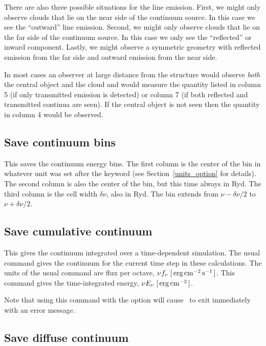 There are also three possible situations for the line emission.
First,
we might only observe clouds that lie on the near side of the continuum
source.
In this case we see the ``outward'' line emission.
Second, we
might only observe clouds that lie on the far side of the continuum source.
In this case we only see the ``reflected'' or inward component.
Lastly,
we might observe a symmetric geometry with reflected emission from the far
side and outward emission from the near side.

In most cases an observer at large distance from the structure would
observe \emph{both} the central object and the cloud and would measure the quantity
listed in column 5 (if only transmitted emission is detected) or column
7 (if both reflected and transmitted continua are seen).  If the central
object is not seen then the quantity in column 4 would be observed.

\subsection{Save continuum bins}

This saves the continuum energy bins.
The first column is the center
of the bin in whatever unit was set after the  keyword
(see Section~\ref{units_option} for details).
The second column is also the center of the bin, but this time always in Ryd.
The third column is the cell width $\delta\nu$, also in Ryd.
The bin extends from $\nu-\delta\nu/2$ to $\nu+\delta\nu/2$.

\subsection{Save cumulative continuum}
\label{sec:CommandSaveCumulativeContinuum}

This gives the continuum integrated over a time-dependent simulation.
The usual  command gives the
continuum for the current time step in these calculations.
The units of the usual  command
are flux per octave, $\nu f_{\nu}\; [\mbox{${\rm\thinspace erg}{\rm\thinspace cm}^{-2}{\rm\thinspace s}^{-1}\,$} ]$.
This command gives the time-integrated energy,
$\nu E_{\nu}\; [\mbox{${\rm\thinspace erg}{\rm\thinspace cm}^{-2}\,$} ]$.

\par
Note that using this command with the option 
will cause \Cloudy\ to exit immediately with an error message.

\subsection{Save diffuse continuum}

